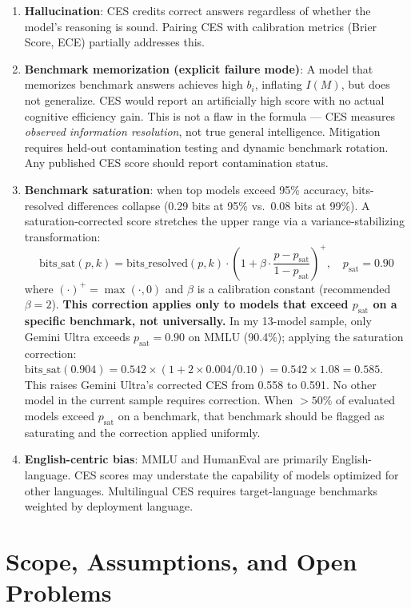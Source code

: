 \documentclass[12pt]{article}
\begin{document}
\begin{enumerate}
    \item \textbf{Hallucination}: CES credits correct answers regardless of whether the model's reasoning is sound. Pairing CES with calibration metrics (Brier Score, ECE) partially addresses this.
    \item \textbf{Benchmark memorization (explicit failure mode)}: A model that memorizes benchmark answers achieves high $b_i$, inflating $I(M)$, but does not generalize. CES would report an artificially high score with no actual cognitive efficiency gain. This is not a flaw in the formula --- CES measures \textit{observed information resolution}, not true general intelligence. Mitigation requires held-out contamination testing and dynamic benchmark rotation. Any published CES score should report contamination status.
    \item \textbf{Benchmark saturation}: when top models exceed 95\% accuracy, bits-resolved differences collapse (0.29 bits at 95\% vs.\ 0.08 bits at 99\%). A saturation-corrected score stretches the upper range via a variance-stabilizing transformation:
    \begin{equation*}
    \mathrm{bits\_sat}(p, k) = \mathrm{bits\_resolved}(p, k) \cdot \left(1 + \beta \cdot \frac{p - p_{\mathrm{sat}}}{1 - p_{\mathrm{sat}}}\right)^+ \!\!, \quad p_{\mathrm{sat}} = 0.90
    \end{equation*}
    where $(\cdot)^+ = \max(\cdot, 0)$ and $\beta$ is a calibration constant (recommended $\beta = 2$). \textbf{This correction applies only to models that exceed $p_{\mathrm{sat}}$ on a specific benchmark, not universally.} In my 13-model sample, only Gemini Ultra exceeds $p_{\mathrm{sat}} = 0.90$ on MMLU (90.4\%); applying the saturation correction: $\mathrm{bits\_sat}(0.904) = 0.542 \times (1 + 2 \times 0.004/0.10) = 0.542 \times 1.08 = 0.585$. This raises Gemini Ultra's corrected CES from 0.558 to 0.591. No other model in the current sample requires correction. When $> 50\%$ of evaluated models exceed $p_{\mathrm{sat}}$ on a benchmark, that benchmark should be flagged as saturating and the correction applied uniformly.
    \item \textbf{English-centric bias}: MMLU and HumanEval are primarily English-language. CES scores may understate the capability of models optimized for other languages. Multilingual CES requires target-language benchmarks weighted by deployment language.
\end{enumerate}

\section{Scope, Assumptions, and Open Problems}
\label{sec:out-of-scope}
\end{document}
